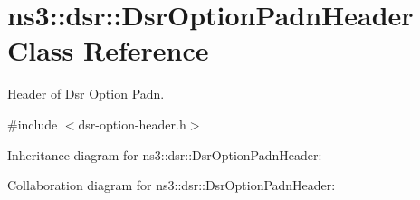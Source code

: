 \hypertarget{classns3_1_1dsr_1_1DsrOptionPadnHeader}{}\section{ns3\+:\+:dsr\+:\+:Dsr\+Option\+Padn\+Header Class Reference}
\label{classns3_1_1dsr_1_1DsrOptionPadnHeader}


\hyperlink{classns3_1_1Header}{Header} of Dsr Option Padn.  




{\ttfamily \#include $<$dsr-\/option-\/header.\+h$>$}



Inheritance diagram for ns3\+:\+:dsr\+:\+:Dsr\+Option\+Padn\+Header\+:


Collaboration diagram for ns3\+:\+:dsr\+:\+:Dsr\+Option\+Padn\+Header\+:
